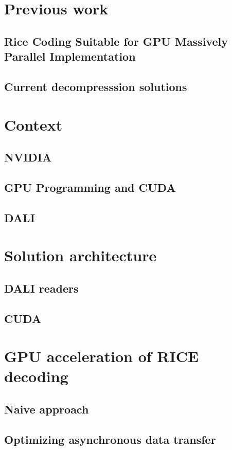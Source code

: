 \documentclass[licencjacka,en]{pracamgr}
\begin{document}
\chapter{Previous work}
\section{Rice Coding Suitable for
  GPU Massively Parallel Implementation}
\section{Current decompresssion solutions}

\chapter{Context}\label{r:losers}

\section{NVIDIA}

\section{GPU Programming and CUDA}

\section{DALI}

\chapter{Solution architecture}
\section{DALI readers}
\section{CUDA}

\chapter{GPU acceleration of RICE decoding}
\section{Naive approach}
\section{Optimizing asynchronous data transfer}
\end{document}
